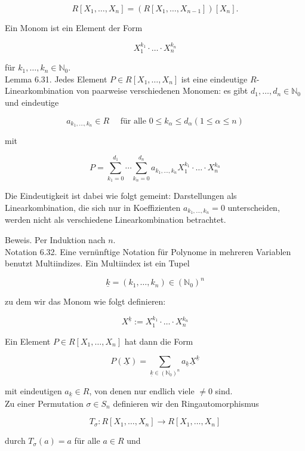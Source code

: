 \documentclass[10pt, letterpaper]{article}
\begin{document}
$$
R\left[X_{1}, \ldots, X_{n}\right]=\left(R\left[X_{1}, \ldots, X_{n-1}\right]\right)\left[X_{n}\right] .
$$

Ein Monom ist ein Element der Form

$$
X_{1}^{k_{1}} \cdot \ldots \cdot X_{n}^{k_{n}}
$$

für $k_{1}, \ldots, k_{n} \in \mathbb{N}_{0}$.\\
Lemma 6.31. Jedes Element $P \in R\left[X_{1}, \ldots, X_{n}\right]$ ist eine eindeutige $R$-Linearkombination von paarweise verschiedenen Monomen: es gibt $d_{1}, \ldots, d_{n} \in \mathbb{N}_{0}$ und eindeutige

$$
a_{k_{1}, \ldots, k_{n}} \in R \quad \text { für alle } 0 \leq k_{\alpha} \leq d_{\alpha}(1 \leq \alpha \leq n)
$$

mit

$$
P=\sum_{k_{1}=0}^{d_{1}} \cdots \sum_{k_{n}=0}^{d_{n}} a_{k_{1}, \ldots, k_{n}} X_{1}^{k_{1}} \cdot \ldots \cdot X_{n}^{k_{n}}
$$

Die Eindeutigkeit ist dabei wie folgt gemeint: Darstellungen als Linearkombination, die sich nur in Koeffizienten $a_{k_{1}, \ldots, k_{n}}=0$ unterscheiden, werden nicht als verschiedene Linearkombination betrachtet.

Beweis. Per Induktion nach $n$.\\
Notation 6.32. Eine vernünftige Notation für Polynome in mehreren Variablen benutzt Multiindizes. Ein Multiindex ist ein Tupel

$$
\underline{k}=\left(k_{1}, \ldots, k_{n}\right) \in\left(\mathbb{N}_{0}\right)^{n}
$$

zu dem wir das Monom wie folgt definieren:

$$
X^{\underline{k}}:=X_{1}^{k_{1}} \cdot \ldots \cdot X_{n}^{k_{n}}
$$

Ein Element $P \in R\left[X_{1}, \ldots, X_{n}\right]$ hat dann die Form

$$
P(\underline{X})=\sum_{\underline{k} \in\left(\mathbb{N}_{0}\right)^{n}} a_{\underline{k}} \underline{X}^{\underline{k}}
$$

mit eindeutigen $a_{\underline{k}} \in R$, von denen nur endlich viele $\neq 0$ sind.\\
Zu einer Permutation $\sigma \in S_{n}$ definieren wir den Ringautomorphismus

$$
T_{\sigma}: R\left[X_{1}, \ldots, X_{n}\right] \rightarrow R\left[X_{1}, \ldots, X_{n}\right]
$$

durch $T_{\sigma}(a)=a$ für alle $a \in R$ und
\end{document}
